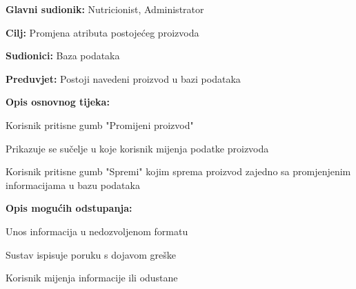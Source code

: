                     \noindent {}
                    \begin{packed_item}
    
                        \item \textbf{Glavni sudionik: }Nutricionist, Administrator
                        \item  \textbf{Cilj:} Promjena atributa postojećeg proizvoda
                        \item  \textbf{Sudionici:} Baza podataka
                        \item  \textbf{Preduvjet:} Postoji navedeni proizvod u bazi podataka
                        \item  \textbf{Opis osnovnog tijeka:} 
                        
                        \item[] \begin{packed_enum}
    
                            \item Korisnik pritisne gumb "Promijeni proizvod"
                            \item Prikazuje se sučelje u koje korisnik mijenja podatke proizvoda
                            \item Korisnik pritisne gumb "Spremi" kojim sprema proizvod zajedno sa promjenjenim informacijama u bazu podataka
                        \end{packed_enum}
                        
                        \item  \textbf{Opis mogućih odstupanja:}
                        
                        \item[] \begin{packed_item}
    
                            \item[2.a] Unos informacija u nedozvoljenom formatu
                            \item[] \begin{packed_enum}
                                
                                \item Sustav ispisuje poruku s dojavom greške
                                \item Korisnik mijenja informacije ili odustane
                                
                            \end{packed_enum}

                            
                        \end{packed_item}
                    \end{packed_item}

